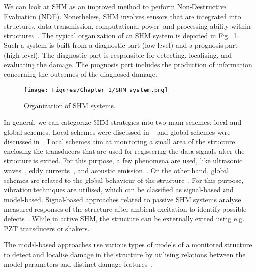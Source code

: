 We can look at SHM as an improved method to perform Non-Destructive Evaluation (NDE).
Nonetheless, SHM involves sensors that are integrated into structures, data transmission, computational power, and processing ability within structures~\cite{Balageas2010}. 
The typical organization of an SHM system is depicted in Fig.~\ref{fig:SHMsystem}. 
Such a system is built from a diagnostic part (low level) and a prognosis part (high level).
The diagnostic part is responsible for detecting, localising, and evaluating the damage.
The prognosis part includes the production of information concerning the outcomes of the diagnosed damage.
\begin{figure} [!ht]
	\begin{center}
		\texttt{[image: Figures/Chapter\_1/SHM\_system.png]}
	\end{center}
	\caption{Organization of SHM systems.} 
	\label{fig:SHMsystem}
\end{figure}
In general, we can categorize SHM strategies into two main schemes: local and global schemes. 
Local schemes were discussed in ~\cite{Grimberg2001,Raghavan2007}
and global schemes were discussed in~\cite{Adams2002,Doebling1998,Uhl2004}. 
Local schemes aim at monitoring a small area of the structure enclosing the transducers that are used for registering the data signals after the structure is exited. 
For this purpose, a few phenomena are used, like ultrasonic waves~\cite{Raghavan2007}, eddy currents~\cite{Grimberg2001}, and acoustic emission~\cite{Grosse2008}.
On the other hand, global schemes are related to the global behaviour of the structure~\cite{Balageas2010}. 
For this purpose, vibration techniques are utilised, which can be classified as signal-based and model-based.
Signal-based approaches related to passive SHM systems analyse measured responses of the structure after ambient excitation to identify possible defects~\cite{Stepinski2013}.
While in active SHM, the structure can be externally exited using e.g. PZT transducers or shakers.
 
The model-based approaches use various types of models of a monitored structure to detect and localise damage in the structure by utilising relations between the model parameters and distinct damage features~\cite{Stepinski2013}. 




%
%
%
%